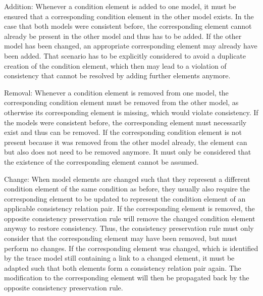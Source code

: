 \begin{properdescription}
    \item[Addition:] Whenever a condition element is added to one model, it must be ensured that a corresponding condition element in the other model exists.
    In the case that both models were consistent before, the corresponding element cannot already be present in the other model and thus has to be added.
    If the other model has been changed, an appropriate corresponding element may already have been added.
    That scenario has to be explicitly considered to avoid a duplicate creation of the condition element, which then may lead to a violation of consistency that cannot be resolved by adding further elements anymore.
    \item[Removal:] Whenever a condition element is removed from one model, the corresponding condition element must be removed from the other model, as otherwise its corresponding element is missing, which would violate consistency.
    If the models were consistent before, the corresponding element must necessarily exist and thus can be removed.
    If the corresponding condition element is not present because it was removed from the other model already, the element can but also does not need to be removed anymore.
    It must only be considered that the existence of the corresponding element cannot be assumed.
    \item[Change:] When model elements are changed such that they represent a different condition element of the same condition as before, they usually also require the corresponding element to be updated to represent the condition element of an applicable consistency relation pair.
    If the corresponding element is removed, the opposite consistency preservation rule will remove the changed condition element anyway to restore consistency.
    Thus, the consistency preservation rule must only consider that the corresponding element may have been removed, but must perform no changes.
    If the corresponding element was changed, which is identified by the trace model still containing a link to a changed element, it must be adapted such that both elements form a consistency relation pair again.
    The modification to the corresponding element will then be propagated back by the opposite consistency preservation rule.
\end{properdescription}

